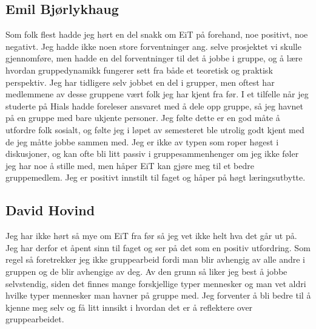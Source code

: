 \subsection*{Emil Bjørlykhaug}
Som folk flest hadde jeg hørt en del snakk om EiT på forehand, noe positivt, noe negativt. 
Jeg hadde ikke noen store forventninger ang. selve prosjektet vi skulle gjennomføre,
 men hadde en del forventninger til det å jobbe i gruppe, og å lære hvordan gruppedynamikk 
fungerer sett fra både et teoretisk og praktisk perspektiv. Jeg har tidligere selv jobbet 
en del i grupper, men oftest har medlemmene av desse gruppene vært folk jeg har kjent 
fra før. I et tilfelle når jeg studerte på Hials hadde foreleser ansvaret med å dele opp gruppe, 
så jeg havnet på en gruppe med bare ukjente personer. Jeg følte dette er en god måte å 
utfordre folk sosialt, og følte jeg i løpet av semesteret ble utrolig godt kjent med de jeg 
måtte jobbe sammen med.
Jeg er ikke av typen som roper høgest i diskusjoner, og kan ofte bli litt passiv i 
gruppesammenhenger om jeg ikke føler jeg har noe å stille med, men håper 
EiT kan gjøre meg til et bedre gruppemedlem. Jeg er positivt innstilt til faget 
og håper på høgt læringsutbytte.

\subsection*{David Hovind} Jeg har ikke hørt så mye om EiT fra før så jeg vet ikke helt hva det går ut på. 
Jeg har derfor et åpent sinn til faget og ser på det som en positiv utfordring. 
Som regel så foretrekker jeg ikke gruppearbeid fordi man blir avhengig av alle andre i gruppen og de blir avhengige av deg. 
Av den grunn så liker jeg best å jobbe selvstendig, siden det finnes mange forskjellige typer mennesker og man vet aldri 
hvilke typer mennesker man havner på gruppe med. Jeg forventer å bli bedre til å kjenne meg selv og få litt innsikt i 
hvordan det er å reflektere over gruppearbeidet.

